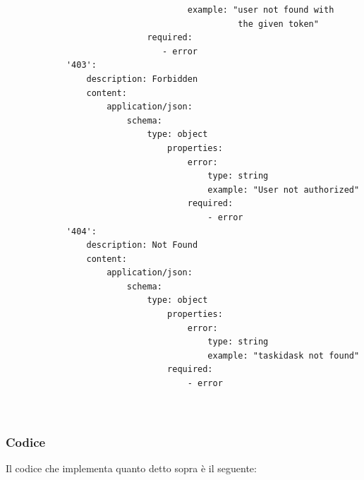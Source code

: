 \documentclass{report}
\begin{document}
\begin{verbatim}
                                    example: "user not found with
                                              the given token"
                            required:
                               - error
            '403':
                description: Forbidden
                content:
                    application/json:
                        schema:
                            type: object
                                properties:
                                    error:
                                        type: string
                                        example: "User not authorized"
                                    required:
                                        - error
            '404':
                description: Not Found
                content:
                    application/json:
                        schema:
                            type: object
                                properties:
                                    error:
                                        type: string
                                        example: "taskidask not found"
                                required:
                                    - error
	
	
\end{verbatim}

\subsubsection*{Codice}

Il codice che implementa quanto detto sopra è il seguente:
\end{document}
